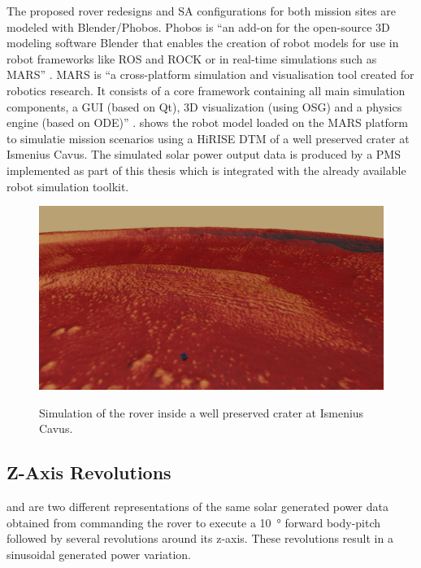 The proposed rover redesigns and \ac{SA} configurations for both mission sites are modeled with Blender/Phobos. Phobos is ``an add-on for the open-source 3D modeling software Blender that enables the creation of robot models for use in robot frameworks like ROS and ROCK or in real-time simulations such as MARS'' . MARS is ``a cross-platform simulation and visualisation tool created for robotics research. It consists of a core framework containing all main simulation components, a GUI (based on Qt), 3D visualization (using OSG) and a physics engine (based on ODE)'' .  shows the robot model loaded on the MARS platform to simulatie mission scenarios using a \ac{HiRISE} \ac{DTM} of a well preserved crater at Ismenius Cavus.  The simulated solar power output data is produced by a \ac{PMS} implemented as part of this thesis which is integrated with the already available robot simulation toolkit.

\begin{figure}[h]
  \captionsetup[subfigure]{justification=centering}
  \centering
  \hypersetup{linkcolor=captionTextColor}
  \includegraphics[width=1\linewidth]{sections/design/simulation/images/mars-sim-ismenius-cavus.png}\\
  \caption[Simulation of the rover inside a well preserved crater at Ismenius Cavus]
          {Simulation of the rover inside a well preserved crater at Ismenius Cavus.}
  \label{fig:simulated-mission-site-ismenius-cavus}
\end{figure}

\subsection{Z-Axis Revolutions}

 and  are two different representations of the same solar generated power data obtained from commanding the rover to execute a \SI{10}{\degree} forward body-pitch followed by several revolutions around its z-axis. These revolutions result in a sinusoidal generated power variation.


